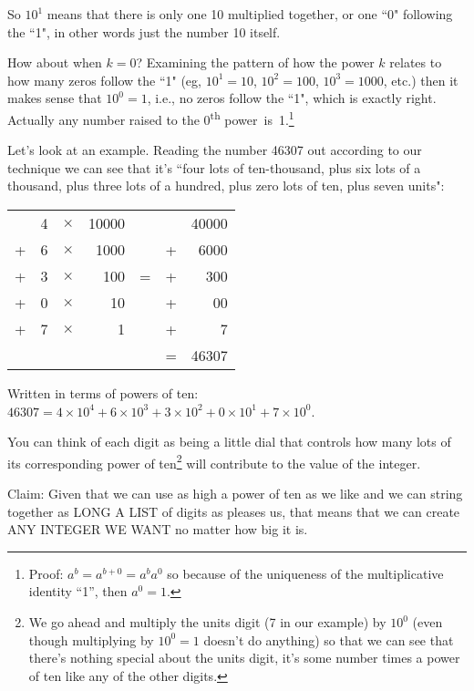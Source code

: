 \documentclass{article}
\begin{document}
So $10^1$ means that there is only one 10 multiplied together, or one ``0" following the ``1",
in other words just the number 10 itself.

How about when $k=0$?
Examining the pattern of how the power $k$ relates to how many zeros follow the ``1"
(eg, $10^1=10$, $10^2=100$, $10^3=1000$,
etc.) then it makes sense that $10^0=1$,
i.e., no zeros follow the ``1", which is exactly right.
Actually any number raised to the 0\textsuperscript{th} power~is~1.\footnote{Proof:
 $a^b=a^{b+0}=a^ba^0$ so because of the uniqueness of the multiplicative identity ``1'', then $a^0=1$.}

Let's look at an example.
Reading the number 46307 out according to our technique we can see
that it's ``four lots of ten-thousand,
plus six lots of a thousand, plus three lots of a hundred,
plus zero lots of ten, plus seven units":

\begin{center}
\begin{tabular}{r r r r c r r}
\phantom & 4 & $\times$ & 10000 & \phantom & \phantom & 40000\\
+ & 6 & $\times$ & 1000 & \phantom & + & 6000\\
+ & 3 & $\times$ & 100 & \; \; = \; \; & + & 300\\
+ & 0 & $\times$ & 10 & \phantom & + & 00\\
+ & 7 & $\times$ & 1 & \phantom & + & 7\\
\cline{6-7}
\phantom & \phantom & \phantom & \phantom & \phantom & = & 46307
\end{tabular}
\end{center}

Written in terms of powers of ten: $46307=4\times10^4+6\times10^3+3\times10^2+0\times10^1+7\times10^0$.

You can think of each digit as being a little dial that controls how many lots
of its corresponding power of ten\footnote{We go ahead and multiply the units digit (7 in our example) by $10^0$ (even though
multiplying by $10^0=1$ doesn't do anything) so that we can see that there's nothing special about the units digit,
it's some number times a power of ten like any of the other digits.} will contribute to the value of the integer.

Claim: Given that we can use as high a power of ten as we like
and we can string together as LONG A LIST of digits as pleases us,
that means that we can create ANY INTEGER WE WANT no matter how big it is.
\end{document}
